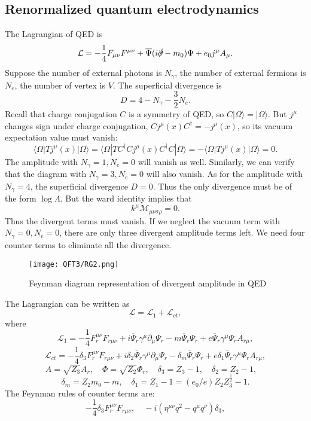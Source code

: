 \subsection{Renormalized quantum electrodynamics}
The Lagrangian of QED is
\[\mathcal{L} = -\frac{1}{4}F_{\mu\nu}F^{\mu\nu} + \overline{\Psi} (i\slashed{\partial}-m_0) \Psi + e_0j^{\mu} A_{\mu}.\]
Suppose the number of external photons is $N_{\gamma}$, the number of external fermions is $N_{e}$, the number of vertex is $V$. The superficial divergence is
\[D = 4 -N_{\gamma} - \frac{3}{2}N_{e}.\]
Recall that charge conjugation $C$ is a symmetry of QED, so $C|\Omega\rangle = | \Omega \rangle$. 
But $j^{\mu}$ changes sign under charge conjugation, $C j^{\mu}(x)C^{\dagger} = - j^{\mu}(x)$, so its vacuum expectation value must vanish:
\[\langle \Omega | T j^{\mu}(x) | \Omega \rangle = \langle \Omega | T C^{\dagger}C j^{\mu}(x)C^{\dagger}C | \Omega \rangle = -\langle \Omega | T j^{\mu}(x) | \Omega \rangle = 0 .\]
The amplitude with $N_{\gamma} = 1,N_{e}=0$ will vanish as well. 
Similarly, we can verify that the diagram with $N_{\gamma} = 3,N_e=0$ will also vanish.
As for the amplitude with $N_{\gamma} = 4$, the superficial divergence $D = 0$. Thus the only divergence must be of the form $\log \Lambda$. But the ward identity implies that
\[k^{\mu}\mathcal{M}_{\mu\nu\sigma\rho} = 0.\]
Thus the divergent terms must vanish.
If we neglect the vacuum term with $N_{\gamma}=0,N_{e}=0$, there are only three divergent amplitude terms left. We need four counter terms to eliminate all the divergence.
\begin{figure}[!h]
\centering
\texttt{[image: QFT3/RG2.png]}
\caption{Feynman diagram representation of divergent amplitude in QED}
\end{figure}
The Lagrangian can be written as
\[\mathcal{L} = \mathcal{L}_1 + \mathcal{L}_{ct},\]
where
\[\mathcal{L}_1 = -\frac{1}{4}F_r^{\mu\nu}F_{r\mu\nu} +  i\overline{\Psi}_r \gamma^{\mu} \partial_{\mu} \Psi_r - m \overline{\Psi}_r \Psi_r + e \overline{\Psi}_r\gamma^{\mu}\Psi_r A_{r\mu} ,\]
\[\mathcal{L}_{ct} = -\frac{1}{4}\delta_3 F_r^{\mu\nu}F_{r\mu\nu} + i\delta_{2}\overline{\Psi}_r \gamma^{\mu} \partial_{\mu} \Psi_r - \delta_m \overline{\Psi}_r \Psi_r + e \delta_1 \overline{\Psi}_r\gamma^{\mu}\Psi_r A_{r\mu} ,\]
\[A = \sqrt{Z_3}A_r , \quad \Phi  = \sqrt{Z_2}\Phi_r , \quad \delta_{3} = Z_3 - 1 , \quad \delta_{2} = Z_2 - 1 , \quad \]
\[\delta_m = Z_2 m_0 - m  , \quad \delta_1 = Z_1 - 1 =(e_0/e) Z_2 Z_3^{\frac{1}{2}} - 1.\]
The Feynman rules of counter terms are:
\[-\frac{1}{4}\delta_3 F_r^{\mu\nu}F_{r\mu\nu} , \quad  -i(\eta^{\mu\nu}q^2-q^{\mu}q^{\nu})\delta_3,\]
